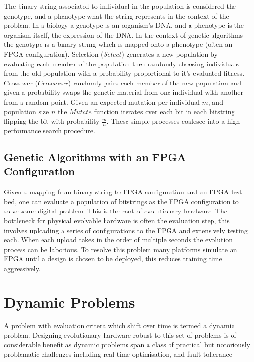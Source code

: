 The binary string associated to individual in the
population is considered the genotype, and a phenotype what the string represents in the
context of the problem. In a biology a genotype is an organism's DNA, and a phenotype is
the organism itself, the expression of the DNA. In the context of genetic algorithms
the genotype is a binary string which is mapped onto a phenotype (often an FPGA configuration).
Selection ($Select$) generates a new population by evaluating each member of the population then
randomly choosing individuals from the old population with a probability proportional to
it's evaluated fitness. Crossover ($Crossover$) randomly pairs each member of the new population
and given a probability swaps the genetic material from one individual with another from a
random point. Given an expected mutation-per-individual $m$, and population size
$n$ the $Mutate$ function iterates over each bit in each bitstring flipping the bit with
probability $\frac{m}{n}$. These simple processes coalesce into a high performance search
procedure.

\subsection{Genetic Algorithms with an FPGA Configuration}
Given a mapping from binary string to FPGA configuration and an FPGA test bed, one can
evaluate a population of bitstrings as the FPGA configuration to solve some digital
problem. This is the root of evolutionary hardware. The bottleneck for physical evolvable
hardware is often the evaluation step, this involves uploading a series of configurations
to the FPGA and extensively testing each. When each upload takes in the order of
multiple seconds the evolution process can be laborious. To resolve this problem
many platforms simulate an FPGA until a design is chosen to be deployed, this reduces
training time aggressively.

\section{Dynamic Problems}
A problem with evaluation critera which shift over time is termed a dynamic problem. Designing
evolutionary hardware robust to this set of problems is of considerable benefit as
dynamic problems span a class of practical but notoriously problematic challenges including
real-time optimisation, and fault tollerance.

